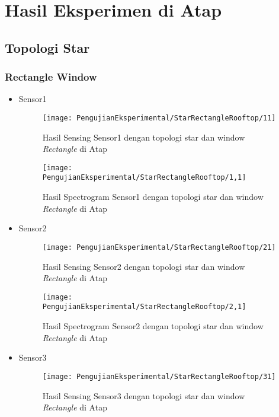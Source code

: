\chapter{Hasil Eksperimen di Atap}
\label{lamp:B}
\section{Topologi Star}
\subsection{Rectangle Window}
\begin{itemize}
\item Sensor1
\begin{figure}[H]
	\centering
	\texttt{[image: PengujianEksperimental/StarRectangleRooftop/11]}
	\caption[Hasil Sensing Sensor1 dengan topologi star dan window {\it Rectangle} di Atap]{Hasil Sensing Sensor1 dengan topologi star dan window {\it Rectangle} di Atap} 
	\label{fig:hasilAtapStarRect11}
\end{figure}

\begin{figure}[H]
	\centering
	\texttt{[image: PengujianEksperimental/StarRectangleRooftop/1,1]}
	\caption[Hasil Spectrogram Sensor1 dengan topologi star dan window {\it Rectangle} di Atap]{Hasil Spectrogram Sensor1 dengan topologi star dan window {\it Rectangle} di Atap} 
	\label{fig:hasilAtapStarRect1,1}
\end{figure}

\item Sensor2
\begin{figure}[H]
	\centering
	\texttt{[image: PengujianEksperimental/StarRectangleRooftop/21]}
	\caption[Hasil Sensing Sensor2 dengan topologi star dan window {\it Rectangle} di Atap]{Hasil Sensing Sensor2 dengan topologi star dan window {\it Rectangle} di Atap} 
	\label{fig:hasilAtapStarRect21}
\end{figure}

\begin{figure}[H]
	\centering
	\texttt{[image: PengujianEksperimental/StarRectangleRooftop/2,1]}
	\caption[Hasil Spectrogram Sensor2 dengan topologi star dan window {\it Rectangle} di Atap]{Hasil Spectrogram Sensor2 dengan topologi star dan window {\it Rectangle} di Atap} 
	\label{fig:hasilAtapStarRect2,1}
\end{figure}

\item Sensor3
\begin{figure}[H]
	\centering
	\texttt{[image: PengujianEksperimental/StarRectangleRooftop/31]}
	\caption[Hasil Sensing Sensor3 dengan topologi star dan window {\it Rectangle} di Atap]{Hasil Sensing Sensor3 dengan topologi star dan window {\it Rectangle} di Atap} 
	\label{fig:hasilAtapStarRect31}
\end{figure}


\end{itemize}
